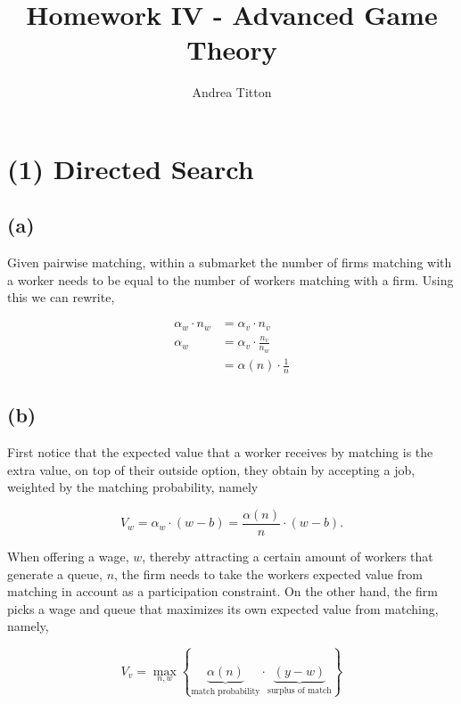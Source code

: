 \documentclass[american]{scrartcl}
\title{Homework IV - Advanced Game Theory }
\author{Andrea Titton}
\begin{document}

\maketitle

\section*{(1) Directed Search}

\subsection*{(a)}

Given pairwise matching, within a submarket the number of firms matching with a worker needs to be equal to the number of workers matching with a firm. Using this we can rewrite,

\begin{equation}
    \begin{split}
        \alpha_w \cdot n_w &= \alpha_v \cdot n_v \\
        \alpha_w &= \alpha_v \cdot \frac{n_v}{n_w} \\
        &= \alpha(n) \cdot \frac{1}{n}
    \end{split}
\end{equation}

\subsection*{(b)}

First notice that the expected value that a worker receives by matching is the extra value, on top of their outside option, they obtain by accepting a job, weighted by the matching probability, namely

\begin{equation}
    V_w = \alpha_w \cdot (w - b) = \frac{\alpha(n)}{n} \cdot (w - b).
\end{equation}

When offering a wage, $w$, thereby attracting a certain amount of workers that generate a queue, $n$, the firm needs to take the workers expected value from matching in account as a participation constraint. On the other hand, the firm picks a wage and queue that maximizes its own expected value from matching, namely,

\begin{equation} \label{firm_opt}
    V_v = \max_{n, w} \left\{ \underbrace{\alpha(n)}_{\text{match probability}} \cdot \underbrace{(y- w)}_{\text{surplus of match}} \right\}
\end{equation}
\end{document}
